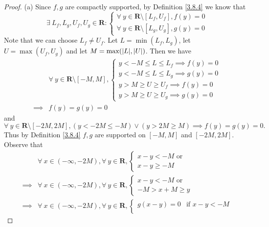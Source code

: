 \begin{proof}{(a)}
    Since \(f, g\) are compactly supported, by Definition \ref{3.8.4} we know that
    \[
        \exists\ L_f, L_g, U_f, U_g \in \mathbf{R} : \begin{cases}
            \forall\ y \in \mathbf{R} \setminus [L_f, U_f], f(y) = 0 \\
            \forall\ y \in \mathbf{R} \setminus [L_g, U_g], g(y) = 0
        \end{cases}
    \]
    Note that we can choose \(L_f \neq U_f\).
    Let \(L = \min(L_f, L_g)\), let \(U = \max(U_f, U_g)\) and let \(M = \max(\abs*{L}, \abs*{U})\).
    Then we have
    \begin{align*}
                 & \forall\ y \in \mathbf{R} \setminus [-M, M], \begin{cases}
            y < -M \leq L \leq L_f \implies f(y) = 0 \\
            y < -M \leq L \leq L_g \implies g(y) = 0 \\
            y > M \geq U \geq U_f \implies f(y) = 0  \\
            y > M \geq U \geq U_g \implies g(y) = 0
        \end{cases} \\
        \implies & f(y) = g(y) = 0
    \end{align*}
    and
    \[
        \forall\ y \in \mathbf{R} \setminus [-2M, 2M], (y < -2M \leq -M) \lor (y > 2M \geq M) \implies f(y) = g(y) = 0.
    \]
    Thus by Definition \ref{3.8.4} \(f, g\) are supported on \([-M, M]\) and \([-2M, 2M]\).
    Observe that
    \begin{align*}
                 & \forall\ x \in (-\infty, -2M), \forall\ y \in \mathbf{R}, \begin{cases}
            x - y < -M \text{ or } \\
            x - y \geq -M
        \end{cases} \\
        \implies & \forall\ x \in (-\infty, -2M), \forall\ y \in \mathbf{R}, \begin{cases}
            x - y < -M \text{ or } \\
            -M > x + M \geq y
        \end{cases} \\
        \implies & \forall\ x \in (-\infty, -2M), \forall\ y \in \mathbf{R}, \begin{cases}
            g(x - y) = 0 & \text{if } x - y < -M        \\

\end{cases}
\end{align*}
\end{proof}
